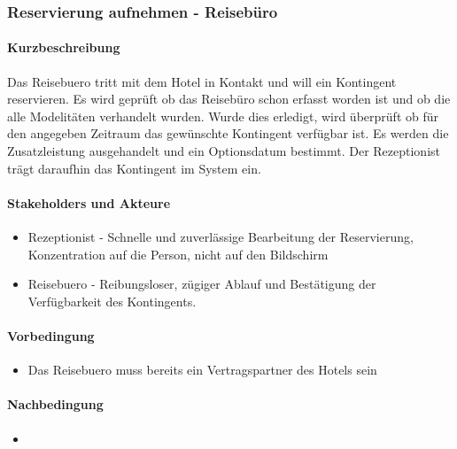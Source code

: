 \subsubsection{Reservierung aufnehmen - Reisebüro}

\paragraph{Kurzbeschreibung}  

Das \Gls{Reisebuero} tritt mit dem Hotel in Kontakt und will ein Kontingent reservieren.
Es wird geprüft ob das Reisebüro schon erfasst worden ist und ob die alle Modelitäten verhandelt wurden.
Wurde dies erledigt, wird überprüft ob für den angegeben Zeitraum das gewünschte Kontingent verfügbar ist.
Es werden die \Gls{Zusatzleistung} ausgehandelt und ein \Gls{Optionsdatum} bestimmt. Der \Gls{Rezeptionist} trägt daraufhin das Kontingent im System ein.

\paragraph{Stakeholders und Akteure}
\begin{itemize}
	\item \Gls{Rezeptionist} - Schnelle und zuverlässige Bearbeitung der \Gls{Reservierung}, Konzentration auf die Person, nicht auf den Bildschirm
	\item \Gls{Reisebuero} - Reibungsloser, zügiger Ablauf und Bestätigung der Verfügbarkeit des Kontingents.
\end{itemize}

\paragraph{Vorbedingung}
\begin{itemize}
	\item Das \Gls{Reisebuero} muss bereits ein Vertragspartner des Hotels sein
\end{itemize}

\paragraph{Nachbedingung}
\begin{itemize}
	\item 
\end{itemize}

